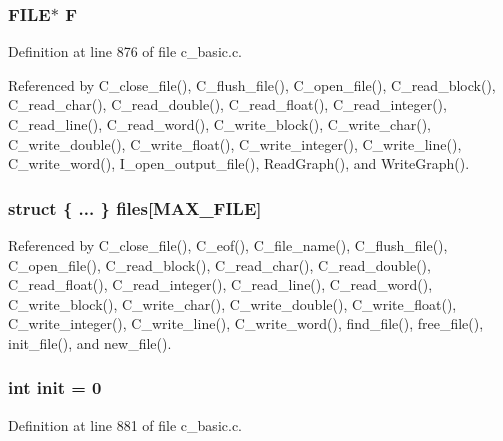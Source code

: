 \subsubsection{\setlength{\rightskip}{0pt plus 5cm}FILE$\ast$ \bf{F}}\label{c__basic_8c_da309aa59bb9aca17267271bd0852231}




Definition at line 876 of file c\_\-basic.c.

Referenced by C\_\-close\_\-file(), C\_\-flush\_\-file(), C\_\-open\_\-file(), C\_\-read\_\-block(), C\_\-read\_\-char(), C\_\-read\_\-double(), C\_\-read\_\-float(), C\_\-read\_\-integer(), C\_\-read\_\-line(), C\_\-read\_\-word(), C\_\-write\_\-block(), C\_\-write\_\-char(), C\_\-write\_\-double(), C\_\-write\_\-float(), C\_\-write\_\-integer(), C\_\-write\_\-line(), C\_\-write\_\-word(), I\_\-open\_\-output\_\-file(), Read\-Graph(), and Write\-Graph().
\subsubsection{\setlength{\rightskip}{0pt plus 5cm}struct \{ ... \} 
 \bf{files}[MAX\_\-FILE]\hspace{0.3cm}{\tt  [static]}}\label{c__basic_8c_adc65ecd9df4b83d94a7fdebece821d7}




Referenced by C\_\-close\_\-file(), C\_\-eof(), C\_\-file\_\-name(), C\_\-flush\_\-file(), C\_\-open\_\-file(), C\_\-read\_\-block(), C\_\-read\_\-char(), C\_\-read\_\-double(), C\_\-read\_\-float(), C\_\-read\_\-integer(), C\_\-read\_\-line(), C\_\-read\_\-word(), C\_\-write\_\-block(), C\_\-write\_\-char(), C\_\-write\_\-double(), C\_\-write\_\-float(), C\_\-write\_\-integer(), C\_\-write\_\-line(), C\_\-write\_\-word(), find\_\-file(), free\_\-file(), init\_\-file(), and new\_\-file().
\subsubsection{\setlength{\rightskip}{0pt plus 5cm}int \bf{init} = 0\hspace{0.3cm}{\tt  [static]}}\label{c__basic_8c_795ea50921b36311ffd5e7baa2ef1f7e}




Definition at line 881 of file c\_\-basic.c.
